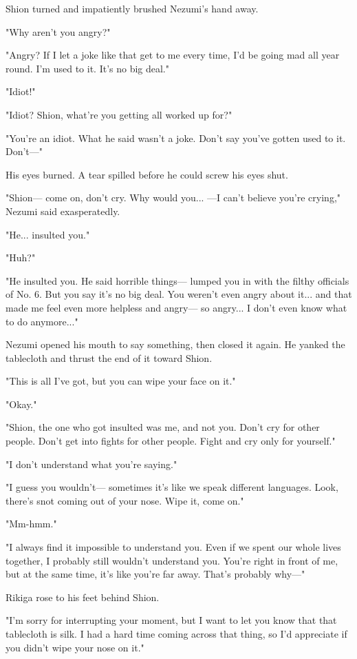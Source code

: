 Shion turned and impatiently brushed Nezumi's hand away.

"Why aren't you angry?"

"Angry? If I let a joke like that get to me every time, I'd be going mad
all year round. I'm used to it. It's no big deal."

"Idiot!"

"Idiot? Shion, what're you getting all worked up for?"

"You're an idiot. What he said wasn't a joke. Don't say you've gotten
used to it. Don't---"

His eyes burned. A tear spilled before he could screw his eyes shut.

"Shion--- come on, don't cry. Why would you... ---I can't believe you're
crying," Nezumi said exasperatedly.

"He... insulted you."

"Huh?"

"He insulted you. He said horrible things--- lumped you in with the filthy
officials of No. 6. But you say it's no big deal. You weren't even angry
about it... and that made me feel even more helpless and angry--- so
angry... I don't even know what to do anymore..."

Nezumi opened his mouth to say something, then closed it again. He
yanked the tablecloth and thrust the end of it toward Shion.

"This is all I've got, but you can wipe your face on it."

"Okay."

"Shion, the one who got insulted was me, and not you. Don't cry for
other people. Don't get into fights for other people. Fight and cry only
for yourself."

"I don't understand what you're saying."

"I guess you wouldn't--- sometimes it's like we speak different languages.
Look, there's snot coming out of your nose. Wipe it, come on."

"Mm-hmm."

"I always find it impossible to understand you. Even if we spent our
whole lives together, I probably still wouldn't understand you. You're
right in front of me, but at the same time, it's like you're far away.
That's probably why---"

Rikiga rose to his feet behind Shion.

"I'm sorry for interrupting your moment, but I want to let you know that
that tablecloth is silk. I had a hard time coming across that thing, so
I'd appreciate if you didn't wipe your nose on it."

